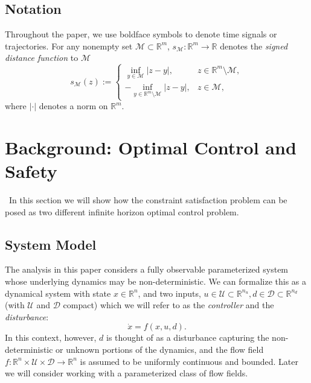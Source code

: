 \documentclass{journal}
\newcommand{\D}{\mathcal{D}}
\newcommand{\M}{\mathcal{M}}
\newcommand{\U}{\mathcal{U}}
\newcommand{\RR}{\mathbb{R}}
\begin{document}
\subsection*{Notation}

Throughout the paper, we use boldface symbols to denote time signals or trajectories.
For any nonempty set $\M\subset\RR^m$, $s_{\M}:\RR^m\to\RR$ denotes the \emph{signed distance function} to $\M$
\[s_\M(z) := \begin{cases}\inf_{y\in\M} |z-y|,&z\in\RR^m\setminus\M, \\ -\inf_{y\in\RR^m\setminus\M} |z-y|,&z\in\M,\end{cases}\]
where $|\cdot|$ denotes a norm on $\RR^m$.

\section{Background: Optimal Control and Safety \label{sec:back}} \
In this section we will show how the constraint satisfaction problem can be posed as two different infinite horizon optimal control problem. 

\subsection{System Model \label{subsec:dynamics}}

The analysis in this paper considers a fully observable parameterized system whose underlying dynamics may be non-deterministic. 
We can formalize this as a dynamical system with state $x\in\RR^n$, and two inputs, $u\in\U\subset\RR^{n_u},  d\in\D\subset\RR^{n_d}$
(with $\U$ and $\D$ compact)
which we will refer to as the \emph{controller} and the \emph{disturbance}:
\begin{equation}\label{fxud}
\dot{x} = f(x,u, d).
\end{equation}
In this context, however, 
$d$ is thought of as a disturbance capturing the non-deterministic or unknown portions of the dynamics, and the flow field $f: \RR^n \times \U \times \D\rightarrow\RR^n$ is assumed to be uniformly continuous and bounded. Later we will consider working with a parameterized class of flow fields.
\end{document}
